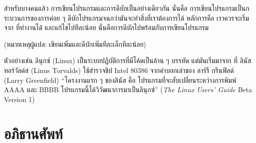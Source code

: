สำหรับบางคนแล้ว การเขียนโปรแกรมและการดีบักเป็นอย่างเดียวกัน นั่นคือ การเขียนโปรแกรมเป็นกระบวนการของการค่อย ๆ ดีบักโปรแกรมจนกว่ามันจะทำสิ่งที่เราต้องการได้ หลักการคือ เราควรจะเริ่มจาก ที่ทำงานได้
และแก้ไขไปทีละน้อย นั่นคือการดีบักไปพร้อมกับการเขียนโปรแกรม 

(หมายเหตุผู้แปล: เขียนเพิ่มและดีบักเพิ่มทีละเล็กทีละน้อย)

ตัวอย่างเช่น ลินุกซ์ (Linux) เป็นระบบปฏิบัติการที่มีโค้ดเป็นล้าน ๆ บรรทัด แต่มันเริ่มมาจาก ที่
ลินัส ทอร์วัลด์ส (Linus Torvalds) ใช้สำรวจชิป Intel 80386  จากคำบอกเล่าของ
ลาร์รี กรีนฟิลด์ (Larry Greenfield) ``โครงงานแรก ๆ ของลินัส คือ โปรแกรมที่จะสับเปลี่ยนระหว่างการพิมพ์
AAAA และ BBBB โปรแกรมนี้ได้วิวัฒนาการมาเป็นลินุกซ์'' ({\em The Linux Users' Guide} Beta Version 1)


\section{อภิธานศัพท์}

